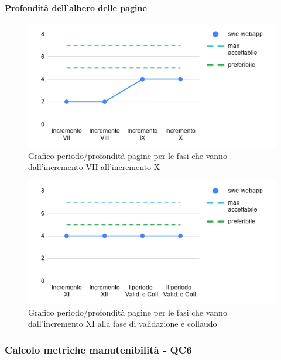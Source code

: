 \paragraph{Profondità dell'albero delle pagine}
	\begin{figure}[H]
			\centering
			\includegraphics[width=0.8\linewidth]{./res/images/QM-PROD-10-PAP.png}
			\caption{Grafico periodo/profondità pagine per le fasi che vanno dall'incremento VII all'incremento X}
			\label{fig:Grafico periodo/profondità pagine per le fasi che vanno dall'incremento VII all'incremento X}
	\end{figure}
	\begin{figure}[H]
			\centering
			\includegraphics[width=0.8\linewidth]{./res/images/QM-PROD-10-PAP_1.png}
			\caption{Grafico periodo/profondità pagine per le fasi che vanno dall'incremento XI alla fase di validazione e collaudo}
			\label{fig:Grafico periodo/profondità pagine per le fasi che vanno dall'incremento XI alla fase di validazione e collaudo}
	\end{figure}

\subsubsection{Calcolo metriche manutenibilità - QC6}
